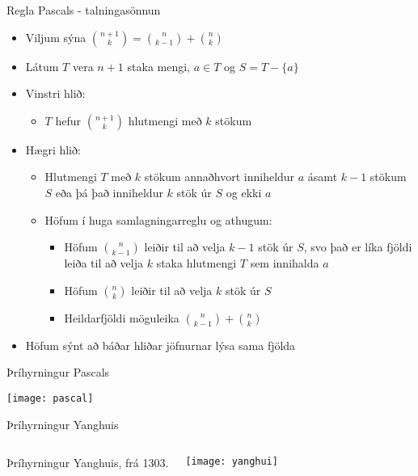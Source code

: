 \documentclass{beamer}
\begin{document}
\begin{frame}{Regla Pascals - talningasönnun}
    \begin{itemize}
        \item Viljum sýna $\binom{n+1}{k} = \binom{n}{k-1} + \binom{n}{k}$ \pause
        \item Látum $T$ vera $n+1$ staka mengi, $a \in T$ og $S = T - \{a\}$ \pause
        \item Vinstri hlið:
        \begin{itemize}
            \item $T$ hefur $\binom{n+1}{k}$ hlutmengi með $k$ stökum \pause
        \end{itemize}
        \item Hægri hlið:
        \begin{itemize}
            \item Hlutmengi $T$ með $k$ stökum annaðhvort inniheldur $a$ ásamt $k-1$ stökum $S$ eða þá það inniheldur $k$ stök úr $S$ og ekki $a$
            \item Höfum í huga samlagningarreglu og athugum: \pause
            \begin{itemize}
                \item Höfum $\binom{n}{k-1}$ leiðir til að velja $k-1$ stök úr $S$, svo það er líka fjöldi leiða til að velja $k$ staka hlutmengi $T$ sem innihalda $a$
                \item Höfum $\binom{n}{k}$ leiðir til að velja $k$ stök úr $S$
                \item Heildarfjöldi möguleika $\binom{n}{k-1} + \binom{n}{k}$
            \end{itemize}
        \end{itemize} \pause
        \item Höfum sýnt að báðar hliðar jöfnurnar lýsa sama fjölda
    \end{itemize}
\end{frame}

\begin{frame}{Þríhyrningur Pascals}
    \begin{center}
    \texttt{[image: pascal]}
    \end{center}
\end{frame}
    
\begin{frame}{Þríhyrningur Yanghuis}
    \begin{columns}
    Þríhyrningur Yanghuis, frá 1303.
    \begin{center}
    \texttt{[image: yanghui]}
    \end{center}
    \end{columns}
\end{frame}
\end{document}

